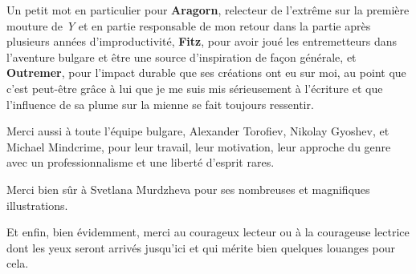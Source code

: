 \documentclass{report}
\begin{document}
Un petit mot en particulier pour \textbf{Aragorn}, relecteur de l'extrême sur la première mouture de \emph{Y} et en partie responsable de mon retour dans la partie après plusieurs années d'improductivité, \textbf{Fitz}, pour avoir joué les entremetteurs dans l'aventure bulgare et être une source d'inspiration de façon générale, et \textbf{Outremer}, pour l'impact durable que ses créations ont eu sur moi, au point que c'est peut-être grâce à lui que je me suis mis sérieusement à l'écriture et que l'influence de sa plume sur la mienne se fait toujours ressentir.

Merci aussi à toute l'équipe bulgare, Alexander Torofiev, Nikolay Gyoshev, et Michael Mindcrime, pour leur travail, leur motivation, leur approche du genre avec un professionnalisme et une liberté d'esprit rares.

Merci bien sûr à Svetlana Murdzheva pour ses nombreuses et magnifiques illustrations.

Et enfin, bien évidemment, merci au courageux lecteur ou à la courageuse lectrice dont les yeux seront arrivés jusqu'ici et qui mérite bien quelques louanges pour cela.
\end{document}
